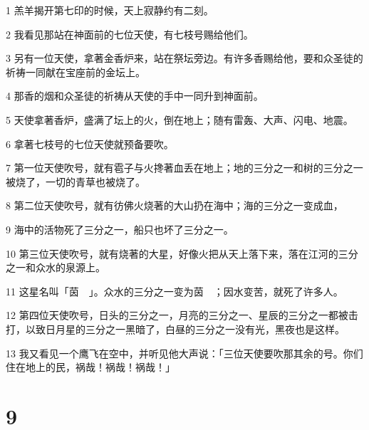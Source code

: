 \par 1 羔羊揭开第七印的时候，天上寂静约有二刻。
\par 2 我看见那站在神面前的七位天使，有七枝号赐给他们。
\par 3 另有一位天使，拿著金香炉来，站在祭坛旁边。有许多香赐给他，要和众圣徒的祈祷一同献在宝座前的金坛上。
\par 4 那香的烟和众圣徒的祈祷从天使的手中一同升到神面前。
\par 5 天使拿著香炉，盛满了坛上的火，倒在地上；随有雷轰、大声、闪电、地震。
\par 6 拿著七枝号的七位天使就预备要吹。
\par 7 第一位天使吹号，就有雹子与火搀著血丢在地上；地的三分之一和树的三分之一被烧了，一切的青草也被烧了。
\par 8 第二位天使吹号，就有彷佛火烧著的大山扔在海中；海的三分之一变成血，
\par 9 海中的活物死了三分之一，船只也坏了三分之一。
\par 10 第三位天使吹号，就有烧著的大星，好像火把从天上落下来，落在江河的三分之一和众水的泉源上。
\par 11 这星名叫「茵　」。众水的三分之一变为茵　；因水变苦，就死了许多人。
\par 12 第四位天使吹号，日头的三分之一，月亮的三分之一、星辰的三分之一都被击打，以致日月星的三分之一黑暗了，白昼的三分之一没有光，黑夜也是这样。
\par 13 我又看见一个鹰飞在空中，并听见他大声说：「三位天使要吹那其余的号。你们住在地上的民，祸哉！祸哉！祸哉！」

\chapter{9}

